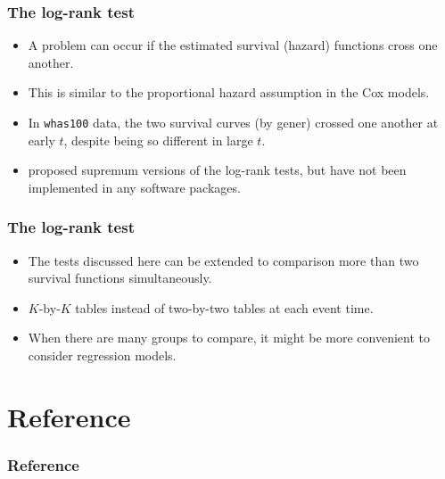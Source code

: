 \documentclass[10pt]{beamer}\usepackage[]{graphicx}\usepackage[]{color}
\newcommand{\code}[1]{{\texttt{#1}}}
\begin{document}
\begin{frame}
  \frametitle{The log-rank test}
  \begin{itemize}
  \item A problem can occur if the estimated survival (hazard) functions cross one another. 
  \item This is similar to the proportional hazard assumption in the Cox models.
  \item In \code{whas100} data, the two survival curves (by gener) crossed one another at early $t$, 
    despite being so different in large $t$.
  \item \citet{fleming1987supremum} proposed supremum versions of the log-rank tests, but have not been implemented in any software packages.
  \end{itemize}
\end{frame}


\begin{frame}
  \frametitle{The log-rank test}
  \begin{itemize}
  \item The tests discussed here can be extended to comparison more than two survival functions simultaneously.
  \item $K$-by-$K$ tables instead of two-by-two tables at each event time.
  \item When there are many groups to compare, it might be more convenient to consider regression models.
  \end{itemize}
\end{frame}


\section{Reference}
\begin{frame}[shrink = 25]
\frametitle{Reference}
\begin{center}
\scriptsize


\end{center}
\end{frame}
\end{document}
